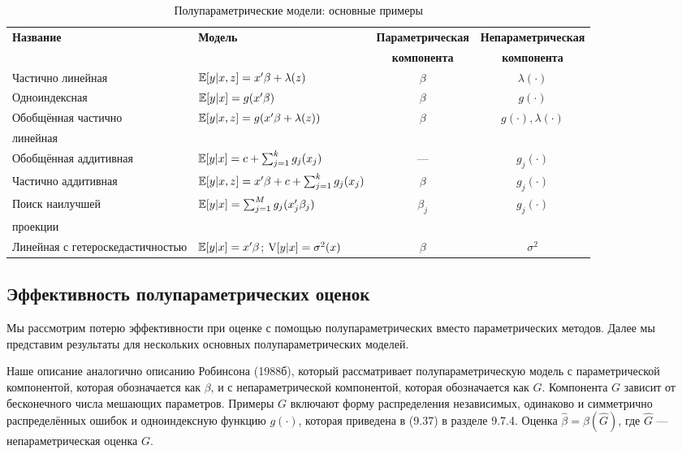 \begin{table}[h]
\begin{center}
\begin{small}
\caption{\label{tab:pred} Полупараметрические модели: основные примеры}
\begin{tabular}[t]{llcc}
\hline
\hline
\bf{Название} & \bf{Модель} & \bf{Параметрическая} & \bf{Непараметрическая} \\
 & & \bf{компонента} & \bf{компонента} \\
\hline
Частично линейная & $\mathbb{E}[y|x,z] = x'\beta + \lambda(z)$ & $\beta$ & $\lambda(\cdot)$ \\
Одноиндексная & $\mathbb{E}[y|x] = g(x'\beta)$ & $\beta$ & $g(\cdot)$ \\
Обобщённая частично & $\mathbb{E}[y|x,z] = g(x'\beta + \lambda(z))$ & $\beta$ & $g(\cdot),\lambda(\cdot)$ \\
линейная & & & \\
Обобщённая аддитивная & $\mathbb{E}[y|x] = c + \sum_{j=1}^k g_j(x_j)$ & --- & $g_j(\cdot)$ \\
Частично аддитивная & $\mathbb{E}[y|x,z] = x'\beta + c + \sum_{j=1}^k g_j(x_j)$ & $\beta$ & $g_j(\cdot)$ \\
Поиск наилучшей & $\mathbb{E}[y|x] = \sum_{j=1}^M g_j(x_j'\beta_j)$ & $\beta_j$ & $g_j(\cdot)$ \\
проекции & & & \\
Линейная с гетероскедастичностью & $\mathbb{E}[y|x] = x'\beta$; $\mathrm{V}[y|x] = \sigma^2(x)$ & $\beta$ & $\sigma^2$ \\
\hline
\hline
\end{tabular}
\end{small}
\end{center}
\end{table}

\subsection{Эффективность полупараметрических оценок}

Мы рассмотрим потерю эффективности при оценке с помощью полупараметрических вместо параметрических методов. Далее мы представим результаты для нескольких основных полупараметрических моделей.

Наше описание аналогично описанию Робинсона (1988б), который рассматривает полупараметрическую модель с параметрической компонентой, которая обозначается как $\beta$, и  с непараметрической компонентой, которая обозначается как $G$. Компонента $G$ зависит от бесконечного числа мешающих параметров. Примеры $G$ включают форму распределения независимых, одинаково и симметрично распределённых ошибок и одноиндексную функцию $g(\cdot)$, которая приведена в (9.37) в разделе 9.7.4. Оценка $\hat{\beta} = \beta(\hat{G})$, где $\hat{G}$ --- непараметрическая оценка $G$.

